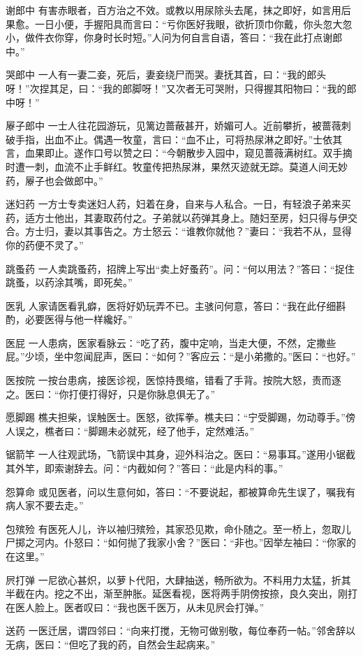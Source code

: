 \documentclass[12pt,UTF8]{ctexbook}
\begin{document}
谢郎中
有害赤眼者，百方治之不效。或教以用尿除头去尾，抹之即好，如言用后果愈。一日小便，手握阳具而言曰：“亏你医好我眼，欲折顶巾你戴，你头忽大忽小，做件衣你穿，你身时长时短。”人问为何自言自语，答曰：“我在此打点谢郎中。”

哭郎中
一人有一妻二妾，死后，妻妾绕尸而哭。妻抚其首，曰：“我的郎头呀！”次捏其足，曰：“我的郎脚呀！”又次者无可哭附，只得握其阳物曰：“我的郎中呀！”

屪子郎中
一士人往花园游玩，见篱边蔷蔽甚开，娇媚可人。近前攀折，被蔷薇刺破手指，出血不止。偶遇一牧童，言曰：“血不止，可将热尿淋之即好。”士依其言，血果即止。遂作口号以赞之曰：“今朝散步入园中，窥见蔷薇满树红。双手摘时遭一刺，血流不止手鲜红。牧童传把热尿淋，果然灭迹就无踪。莫道人间无妙药，屪子也会做郎中。”

迷妇药
一方士专卖迷妇人药，妇着在身，自来与人私合。一日，有轻浪子弟来买药，适方士他出，其妻取药付之。子弟就以药弹其身上。随妇至房，妇只得与伊交合。方士归，妻以其事告之。方士怒云：“谁教你就他？”妻曰：“我若不从，显得你的药便不灵了。”

跳蚤药
一人卖跳蚤药，招牌上写出“卖上好蚤药”。问：“何以用法？”答曰：“捉住跳蚤，以药涂其嘴，即死矣。”

医乳
人家请医看乳癖，医将好奶玩弄不已。主骇问何意，答曰：“我在此仔细斟酌，必要医得与他一样纔好。”

医屁
一人患病，医家看脉云：“吃了药，腹中定响，当走大便，不然，定撒些屁。”少顷，坐中忽闻屁声，医曰：“如何？”客应云：“是小弟撒的。”医曰：“也好。”

医按院
一按台患病，接医诊视，医惊持畏缩，错看了手背。按院大怒，责而逐之。医曰：“你打便打得好，只是你脉息俱无了。”

愿脚踢
樵夫担柴，误触医士。医怒，欲挥拳。樵夫曰：“宁受脚踢，勿动尊手。”傍人误之，樵者曰：“脚踢未必就死，经了他手，定然难活。”

锯箭竿
一人往观武场，飞箭误中其身，迎外科治之。医曰：“易事耳。”遂用小锯截其外竿，即索谢辞去。问：“内截如何？”答曰：“此是内科的事。”

怨算命
或见医者，问以生意何如，答曰：“不要说起，都被算命先生误了，嘱我有病人家不要去走。”

包殡殓
有医死人儿，许以袖归殡殓，其家恐见欺，命仆随之。至一桥上，忽取儿尸掷之河内。仆怒曰：“如何抛了我家小舍？”医曰：“非也。”因举左袖曰：“你家的在这里。”

屄打弹
一尼欲心甚炽，以萝卜代阳，大肆抽送，畅所欲为。不料用力太猛，折其半截在内。挖之不出，渐至肿胀。延医看视，医将两手阴傍按捺，良久突出，刚打在医人脸上。医者叹曰：“我也医千医万，从未见屄会打弹。”

送药
一医迁居，谓四邻曰：“向来打搅，无物可做别敬，每位奉药一帖。”邻舍辞以无病，医曰：“但吃了我的药，自然会生起病来。”
\end{document}
